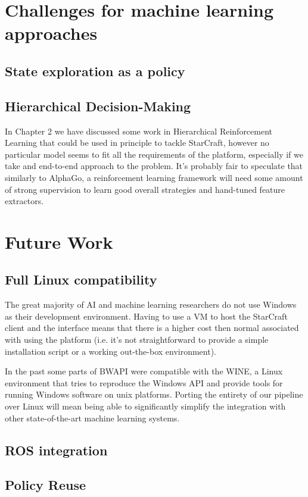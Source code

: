 \section{Challenges for machine learning approaches}

\subsection{State exploration as a policy}

\subsection{Hierarchical Decision-Making}

In Chapter 2 we have discussed some work in Hierarchical Reinforcement Learning
that could be used in principle to tackle StarCraft, however no particular model
seems to fit all the requirements of the platform, especially if we take and
end-to-end approach to the problem. It's probably fair to speculate that
similarly to AlphaGo, a reinforcement learning framework will need some amount
of strong supervision to learn good overall strategies and hand-tuned feature
extractors.


\section{Future Work}

\subsection{Full Linux compatibility}

The great majority of AI and machine learning researchers do not use Windows as
their development environment. Having to use a VM to host the StarCraft client
and the interface means that there is a higher cost then normal associated with
using the platform (i.e. it's not straightforward to provide a simple
installation script or a working out-the-box environment).

In the past some parts of BWAPI were compatible with the WINE, a Linux
environment that tries to reproduce the Windows API and provide tools for
running Windows software on unix platforms. Porting the entirety of our pipeline
over Linux will mean being able to significantly simplify the integration with
other state-of-the-art machine learning systems. 

\subsection{ROS integration}




\subsection{Policy Reuse}

